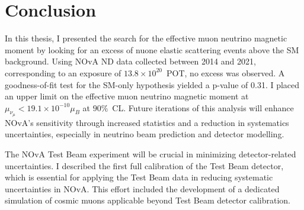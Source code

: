 \chapter{Conclusion}\label{sec:Conclusion}

In this thesis, I presented the search for the effective muon neutrino magnetic moment by looking for an excess of \gls{nuone} elastic scattering events above the \gls{SM} background. Using \gls{NOvA} \gls{ND} data collected between 2014 and 2021, corresponding to an exposure of $13.8\times10^{20}$~\gls{POT}, no excess was observed. A goodness-of-fit test for the \gls{SM}-only hypothesis yielded a p-value of 0.31. I placed an upper limit on the effective muon neutrino magnetic moment at $\mu_{\nu_\mu}<19.1\times 10^{-10}\mu_B$ at $90\%$~\gls{CL}. Future iterations of this analysis will enhance \gls{NOvA}'s sensitivity through increased statistics and a reduction in systematics uncertainties, especially in neutrino beam prediction and detector modelling.

The NOvA Test Beam experiment will be crucial in minimizing detector-related uncertainties. I described the first full calibration of the Test Beam detector, which is essential for applying the Test Beam data in reducing systematic uncertainties in \gls{NOvA}. This effort included the development of a dedicated simulation of cosmic muons applicable beyond Test Beam detector calibration.